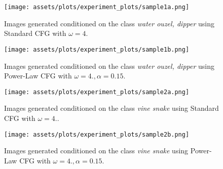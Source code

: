 \begin{figure}[ht]
    \centering
    \begin{minipage}{0.95\linewidth}
        \centering
        \texttt{[image: assets/plots/experiment\_plots/sample1a.png]}
        \vspace{-.25cm}
        \caption{Images generated conditioned on the class \textit{water ouzel, dipper} using Standard CFG with $\omega=4$.}
        \vspace{.5cm}
        \texttt{[image: assets/plots/experiment\_plots/sample1b.png]} 
        \vspace{-.25cm}
        \caption{Images generated conditioned on the class \textit{water ouzel, dipper} using Power-Law CFG with $\omega=4., \alpha=0.15$.}
        \vspace{.5cm}
    \end{minipage}
    
    
    \begin{minipage}{0.95\linewidth}
        \centering
        \texttt{[image: assets/plots/experiment\_plots/sample2a.png]}
        \vspace{-.25cm}
        \caption{Images generated conditioned on the class \textit{vine snake} using Standard CFG with $\omega=4.$.}
        \vspace{.5cm}
        \texttt{[image: assets/plots/experiment\_plots/sample2b.png]} 
        \vspace{-.25cm}
        \caption{Images generated conditioned on the class \textit{vine snake} using Power-Law CFG with $\omega=4., \alpha=0.15$.}
    \end{minipage}
\end{figure}

\clearpage

